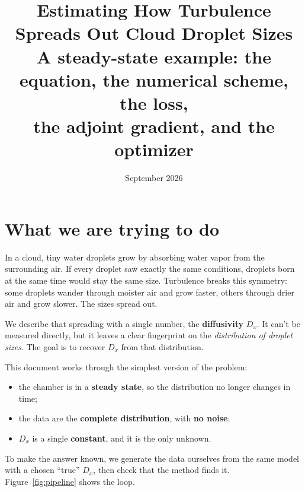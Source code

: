\documentclass[11pt]{article}
\title{\textbf{Estimating How Turbulence Spreads Out Cloud Droplet Sizes}\\[4pt]
\large A steady-state example: the equation, the numerical scheme, the loss,\\ the adjoint gradient, and the optimizer}
\date{September 2026}
\author{}
\begin{document}
\maketitle
\vspace{-2em}
\tableofcontents

\section{What we are trying to do}
In a cloud, tiny water droplets grow by absorbing water vapor from the surrounding air. If every droplet saw exactly the same conditions, droplets born at the same time would stay the same size. Turbulence breaks this symmetry: some droplets wander through moister air and grow faster, others through drier air and grow slower. The sizes spread out.

We describe that spreading with a single number, the \textbf{diffusivity} $D_x$. It can't be measured directly, but it leaves a clear fingerprint on the \emph{distribution of droplet sizes}. The goal is to recover $D_x$ from that distribution.

This document works through the simplest version of the problem:
\begin{itemize}
\item the chamber is in a \textbf{steady state}, so the distribution no longer changes in time;
\item the data are the \textbf{complete distribution}, with \textbf{no noise};
\item $D_x$ is a single \textbf{constant}, and it is the only unknown.
\end{itemize}
To make the answer known, we generate the data ourselves from the same model with a chosen ``true'' $D_x$, then check that the method finds it. Figure~\ref{fig:pipeline} shows the loop.
\end{document}
